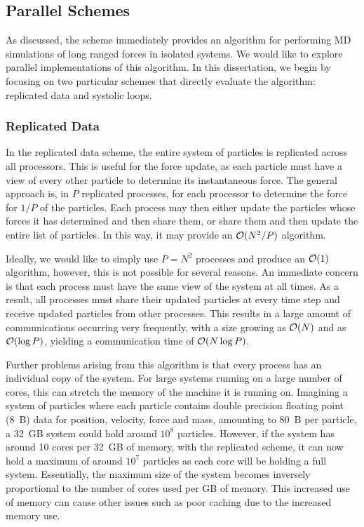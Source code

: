 \subsection{Parallel Schemes}

%
As discussed, the \velocityverlet{} scheme
immediately provides an algorithm for
performing MD simulations of long ranged forces in isolated systems.
%
We would like to explore parallel implementations of this algorithm.
%
In this dissertation, we begin by focusing on two particular schemes
that directly evaluate the \velocityverlet{} algorithm:
replicated data and systolic loops.



\subsubsection{Replicated Data}

%
In the replicated data scheme,
the entire system of particles is replicated across all processors.
%
This is useful for the force update, as each particle must have a view of
every other particle to determine its instantaneous force.
%
The general approach is, in $P$ replicated processes, for each processor
to determine the force for $1/P$ of the particles.
%
Each process may then either update the particles whose forces it has
determined and then share them, or share them and then update the entire
list of particles.
%
In this way, it may provide an $\mathcal{O}{(N^2/P)}$ algorithm.

%
Ideally, we would like to simply use $P = N^2$ processes and produce an
$\mathcal{O}{(1)}$ algorithm, however, this is not possible for several reasons.
%
An immediate concern is that each process must have the same view of the
system at all times.
%
As a result, all processes must share their updated particles at
every time step and receive updated particles from other processes.
%
This results in a large amount of communications occurring very frequently,
with a size growing as $\mathcal{O}{(N)}$ and as $\mathcal{O}{(\log{P})}$,
yielding a communication time of $\mathcal{O}{(N \log{P})}$.

Further problems arising from this algorithm is that every process has
an individual copy of the system.
%
For large systems running on a large number of cores,
this can stretch the memory of the machine it is running on.
%
Imagining a system of particles where each particle contains double
precision floating point (8~B) data for position, velocity, force and mass,
amounting to 80~B per particle, a 32~GB system could hold around $10^8$
particles.
%
However, if the system has around 10 cores per 32~GB of memory,
with the replicated scheme,
it can now hold a maximum of around $10^7$ particles
as each core will be holding a full system.
%
Essentially, the maximum size of the system becomes inversely proportional
to the number of cores used per GB of memory.
%
This increased use of memory can cause other issues such as poor caching
due to the increased memory use.

